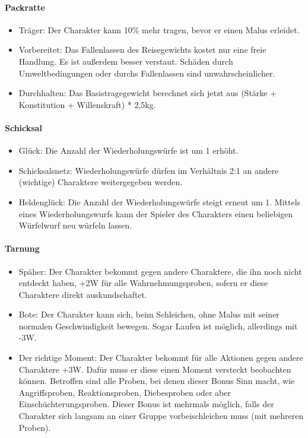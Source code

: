 \documentclass{article}
\begin{document}
\paragraph{Packratte}

\begin{itemize}
\item Träger: Der Charakter kann 10\% mehr tragen, bevor er einen Malus erleidet.
\item Vorbereitet: Das Fallenlassen des Reisegewichts kostet nur eine freie Handlung. Es ist außerdem besser verstaut. Schäden durch Umweltbedingungen oder durchs Fallenlassen sind unwahrscheinlicher.
\item Durchhalten: Das Basistragegewicht berechnet sich jetzt aus (Stärke + Konstitution +  Willenskraft) * 2,5kg.
\end{itemize}

\paragraph{Schicksal}

\begin{itemize}
\item Glück: Die Anzahl der Wiederholungswürfe ist um 1 erhöht.
\item Schicksalsnetz: Wiederholungswürfe dürfen im Verhältnis 2:1 an andere (wichtige) Charaktere weitergegeben werden.
\item Heldenglück: Die Anzahl der Wiederholungswürfe steigt erneut um 1. Mittels eines Wiederholungswurfs kann der Spieler des Charakters einen beliebigen Würfelwurf neu würfeln lassen.
\end{itemize}

\paragraph{Tarnung}

\begin{itemize}
\item Späher: Der Charakter bekommt gegen andere Charaktere, die ihn noch nicht entdeckt haben, +2W für alle Wahrnehmungsproben, sofern er diese Charaktere direkt auskundschaftet.
\item Bote: Der Charakter kann sich, beim Schleichen, ohne Malus mit seiner normalen Geschwindigkeit bewegen. Sogar Laufen ist möglich, allerdings mit -3W.
\item Der richtige Moment: Der Charakter bekommt für alle Aktionen gegen andere Charaktere +3W. Dafür muss er diese einen Moment versteckt beobachten können. Betroffen sind alle Proben, bei denen dieser Bonus Sinn macht, wie Angriffsproben, Reaktionsproben, Diebesproben oder aber Einschüchterungsproben. Dieser Bonus ist mehrmals möglich, falls der Charakter sich langsam an einer Gruppe vorbeischleichen muss (mit mehreren Proben).
\end{itemize}
\end{document}
